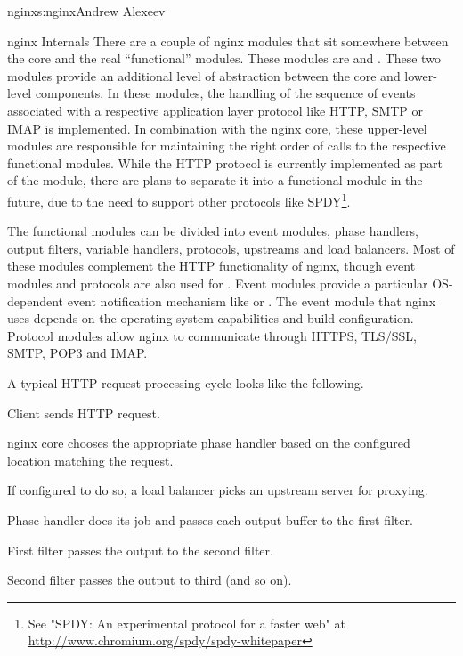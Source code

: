 \begin{aosachapter}{nginx}{s:nginx}{Andrew Alexeev}
\begin{aosasect1}{nginx Internals}
There are a couple of nginx modules that sit somewhere between the
core and the real ``functional'' modules. These modules are
 and . These two modules provide an additional
level of abstraction between the core and lower-level components. In
these modules, the handling of the sequence of events associated with
a respective application layer protocol like HTTP, SMTP or IMAP is
implemented. In combination with the nginx core, these upper-level
modules are responsible for maintaining the right order of calls to
the respective functional modules. While the HTTP protocol is
currently implemented as part of the  module, there are plans
to separate it into a functional module in the future, due to 
the need to support other protocols like SPDY\footnote{See "SPDY: An experimental protocol for a faster web" at \url{http://www.chromium.org/spdy/spdy-whitepaper}}.

The functional modules can be divided into event modules, phase
handlers, output filters, variable handlers, protocols, upstreams and
load balancers. Most of these modules complement the HTTP
functionality of nginx, though event modules and protocols are also
used for . Event modules provide a particular OS-dependent
event notification mechanism like  or .  The
event module that nginx uses depends on the operating system
capabilities and build configuration. Protocol modules allow nginx to
communicate through HTTPS, TLS/SSL, SMTP, POP3 and IMAP.

A typical HTTP request processing cycle looks like the following.

\begin{aosaenumerate}

\item Client sends HTTP request.

\item nginx core chooses the appropriate phase handler based on the
  configured location matching the request.

\item If configured to do so, a load balancer picks an upstream server
  for proxying.

\item Phase handler does its job and passes each output buffer to the first
  filter.

\item First filter passes the output to the second filter.

\item Second filter passes the output to third (and so on).


\end{aosaenumerate}
\end{aosasect1}
\end{aosachapter}
